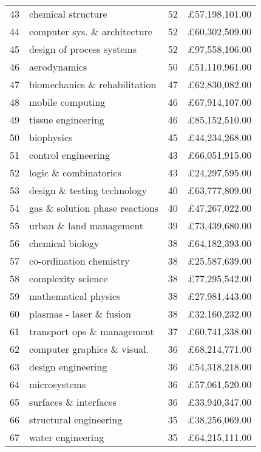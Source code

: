\begin{spacing}{0.9}
\begin{longtable}[c]{r|>{\raggedleft\arraybackslash}m{6.5cm}|>{\raggedleft\arraybackslash}m{1.9cm}|r}
{43} & {chemical structure} & {52} & {\pounds57,198,101.00}\\
{44} & {computer sys. \& architecture} & {52} & {\pounds60,302,509.00}\\
{45} & {design of process systems} & {52} & {\pounds97,558,106.00}\\
{46} & {aerodynamics} & {50} & {\pounds51,110,961.00}\\
{47} & {biomechanics \& rehabilitation} & {47} & {\pounds62,830,082.00}\\
{48} & {mobile computing} & {46} & {\pounds67,914,107.00}\\
{49} & {tissue engineering} & {46} & {\pounds85,152,510.00}\\
{50} & {biophysics} & {45} & {\pounds44,234,268.00}\\
{51} & {control engineering} & {43} & {\pounds66,051,915.00}\\
{52} & {logic \& combinatorics} & {43} & {\pounds24,297,595.00}\\
{53} & {design \& testing technology} & {40} & {\pounds63,777,809.00}\\
{54} & {gas \& solution phase reactions} & {40} & {\pounds47,267,022.00}\\
{55} & {urban \& land management} & {39} & {\pounds73,439,680.00}\\
{56} & {chemical biology} & {38} & {\pounds64,182,393.00}\\
{57} & {co-ordination chemistry} & {38} & {\pounds25,587,639.00}\\
{58} & {complexity science} & {38} & {\pounds77,295,542.00}\\
{59} & {mathematical physics} & {38} & {\pounds27,981,443.00}\\
{60} & {plasmas - laser \& fusion} & {38} & {\pounds32,160,232.00}\\
{61} & {transport ops \& management} & {37} & {\pounds60,741,338.00}\\
{62} & {computer graphics \& visual.} & {36} & {\pounds68,214,771.00}\\
{63} & {design engineering} & {36} & {\pounds54,318,218.00}\\
{64} & {microsystems} & {36} & {\pounds57,061,520.00}\\
{65} & {surfaces \& interfaces} & {36} & {\pounds33,940,347.00}\\
{66} & {structural engineering} & {35} & {\pounds38,256,069.00}\\
{67} & {water engineering} & {35} & {\pounds64,215,111.00}\\

\end{longtable}
\end{spacing}
